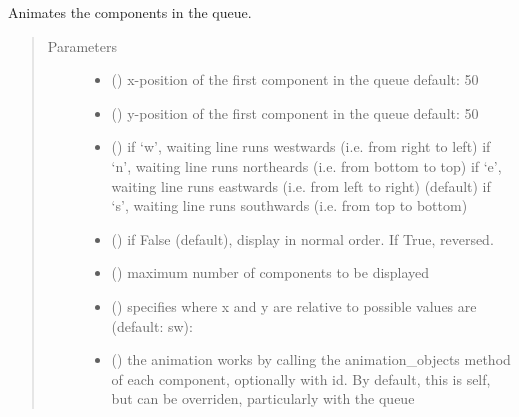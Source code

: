 \documentclass[letterpaper,10pt,english]{sphinxmanual}
\begin{document}
\begin{fulllineitems}
\begin{fulllineitems}
\end{fulllineitems}


\begin{fulllineitems}
\label{\detokenize{Reference:salabim.Queue.animate}}
Animates the components in the queue.
\begin{quote}\begin{description}
\item[{Parameters}] \leavevmode\begin{itemize}
\item {} 
 () \textendash{} x-position of the first component in the queue 
default: 50

\item {} 
 () \textendash{} y-position of the first component in the queue 
default: 50

\item {} 
 () \textendash{} if ‘w’, waiting line runs westwards (i.e. from right to left) 
if ‘n’, waiting line runs northeards (i.e. from bottom to top) 
if ‘e’, waiting line runs eastwards (i.e. from left to right) (default) 
if ‘s’, waiting line runs southwards (i.e. from top to bottom)

\item {} 
 () \textendash{} if False (default), display in normal order. If True, reversed.

\item {} 
 () \textendash{} maximum number of components to be displayed

\item {} 
 () \textendash{} specifies where x and y are relative to 
possible values are (default: sw): 

\item {} 
 () \textendash{} the animation works by calling the animation\_objects method of each component, optionally
with id. By default, this is self, but can be overriden, particularly with the queue


\end{itemize}
\end{description}
\end{quote}
\end{fulllineitems}
\end{fulllineitems}
\end{document}
